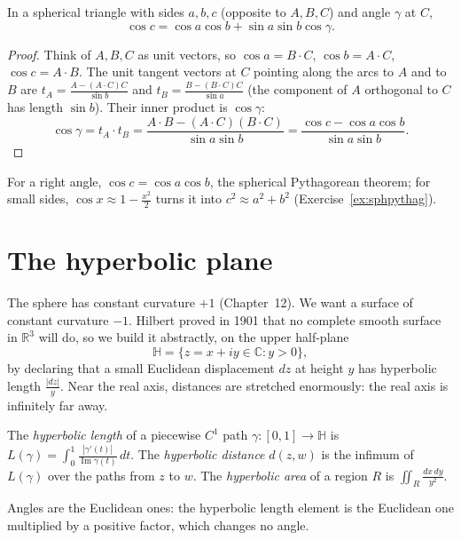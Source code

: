 \begin{proposition}\label{prop:sphcos}
In a spherical triangle with sides $a,b,c$ (opposite to $A,B,C$) and angle $\gamma$ at $C$,
\[
\cos c=\cos a\cos b+\sin a\sin b\cos\gamma.
\]
\end{proposition}

\begin{proof}
Think of $A,B,C$ as unit vectors, so $\cos a=B\cdot C$, $\cos b=A\cdot C$, $\cos c=A\cdot B$. The unit tangent vectors at $C$ pointing along the arcs to $A$
and to $B$ are $t_A=\frac{A-(A\cdot C)C}{\sin b}$ and $t_B=\frac{B-(B\cdot C)C}{\sin a}$ (the component of $A$ orthogonal to $C$ has length $\sin b$). Their
inner product is $\cos\gamma$:
\[
\cos\gamma=t_A\cdot t_B=\frac{A\cdot B-(A\cdot C)(B\cdot C)}{\sin a\sin b}=\frac{\cos c-\cos a\cos b}{\sin a\sin b}.
\]
\end{proof}

For a right angle, $\cos c=\cos a\cos b$, the spherical Pythagorean theorem; for small sides, $\cos x\approx1-\frac{x^2}2$ turns it into $c^2\approx a^2+b^2$
(Exercise~\ref{ex:sphpythag}).

\section{The hyperbolic plane}

The sphere has constant curvature $+1$ (Chapter~12). We want a surface of constant curvature $-1$. Hilbert proved in 1901 that no complete smooth surface
in $\mathbb R^3$ will do, so we build it abstractly, on the upper half-plane
\[
\mathbb H=\{z=x+iy\in\mathbb C:y>0\},
\]
by declaring that a small Euclidean displacement $dz$ at height $y$ has hyperbolic length $\frac{|dz|}y$. Near the real axis, distances are stretched
enormously: the real axis is infinitely far away.

\begin{definition}
The \emph{hyperbolic length} of a piecewise $C^1$ path $\gamma:[0,1]\to\mathbb H$ is $L(\gamma)=\int_0^1\frac{|\gamma'(t)|}{\operatorname{Im}\gamma(t)}\,dt$.
The \emph{hyperbolic distance} $d(z,w)$ is the infimum of $L(\gamma)$ over the paths from $z$ to $w$. The \emph{hyperbolic area} of a region $R$ is
$\iint_R\frac{dx\,dy}{y^2}$.
\end{definition}

Angles are the Euclidean ones: the hyperbolic length element is the Euclidean one multiplied by a positive factor, which changes no angle.

